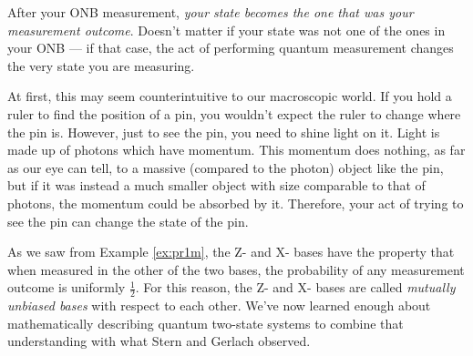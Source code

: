 \documentclass{article}
\theoremstyle{definition}
\begin{document}
After your ONB measurement, \textit{your state becomes the one that was your measurement outcome}.  Doesn't matter if your state was not one of the ones in your ONB --- if that case, the act of performing quantum measurement changes the very state you are measuring.

At first, this may seem counterintuitive to our macroscopic world.  If you hold a ruler to find the position of a pin, you wouldn't expect the ruler to change where the pin is.  However, just to see the pin, you need to shine light on it.  Light is made up of photons which have momentum.  This momentum does nothing, as far as our eye can tell, to a massive (compared to the photon) object like the pin, but if it was instead a much smaller object with size comparable to that of photons, the momentum could be absorbed by it.  Therefore, your act of trying to see the pin can change the state of the pin.

As we saw from Example \ref{ex:pr1m}, the Z- and X- bases have the property that when measured in the other of the two bases, the probability of any measurement outcome is uniformly $\frac{1}{2}$.  For this reason, the Z- and X- bases are called \textit{mutually unbiased bases} with respect to each other.  We've now learned enough about mathematically describing quantum two-state systems to combine that understanding with what Stern and Gerlach observed.
\end{document}
